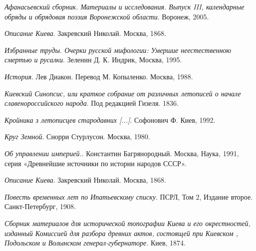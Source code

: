 \emph{Афанасьевский сборник. Материалы и исследования. Выпуск III, календарные обряды
и обрядовая поэзия Воронежской области}. Воронеж, 2005.

\emph{Описание Киева}. Закревский Николай. Москва, 1868.

\emph{Избранные труды. Очерки русской мифологии: Умершие неестественною смертью и русалки}. Зеленин Д. К. Индрик, Москва, 1995.

\emph{История}. Лев Диакон. Перевод М. Копыленко. Москва, 1988.

\emph{Киевский Синопсис, или краткое собрание от различных летописей о начале славенороссийского народа}. Под редакцией Гизеля. 1836.

\emph{Кройника з летописцев стародавних [...]}. Софонович Ф. Киев, 1992.

\emph{Круг Земной}. Снорри Стурлусон. Москва, 1980.

\emph{Об управлении империей.}. Константин Багрянородный. Москва, Наука, 1991, серия «Древнейшие источники по истории народов СССР».

\emph{Описание Киева}. Закревский Николай. Москва, 1868.

\emph{Повесть временных лет по Ипатьевскому списку}. ПСРЛ, Том 2, Издание второе. Санкт-Петербург, 1908. 

\emph{Сборник материалов для исторической топографии Киева и его окрестностей, изданный Комиссией для разбора древних актов, состоящей при Киевском , Подольском и Волынском генерал-губернаторе}. Киев, 1874.

